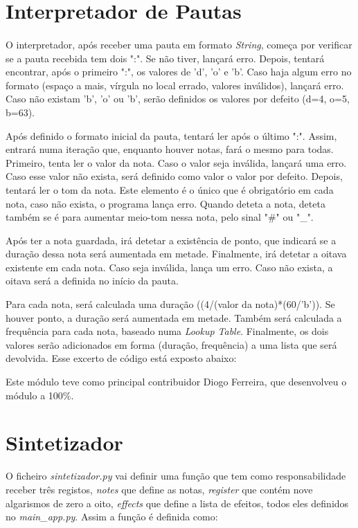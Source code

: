 \documentclass[11pt,openany,twoside]{report}
\begin{document}
\section{Interpretador de Pautas}
\paragraph{ } O interpretador, após receber uma pauta em formato \textit{String}, começa por verificar se a pauta recebida tem dois ":". Se não tiver, lançará erro. Depois, tentará encontrar, após o primeiro ":", os valores de 'd', 'o' e 'b'. Caso haja algum erro no formato (espaço a mais, vírgula no local errado, valores inválidos), lançará erro. Caso não existam 'b', 'o' ou 'b', serão definidos os valores por defeito (d=4, o=5, b=63).

Após definido o formato inicial da pauta, tentará ler após o último ":". Assim, entrará numa iteração que, enquanto houver notas, fará o mesmo para todas. Primeiro, tenta ler o valor da nota. Caso o valor seja inválida, lançará uma erro. Caso esse valor não exista, será definido como valor o valor por defeito. Depois, tentará ler o tom da nota. Este elemento é o único que é obrigatório em cada nota, caso não exista, o programa lança erro. Quando deteta a nota, deteta também se é para aumentar meio-tom nessa nota, pelo sinal "\#" ou "\_".

Após ter a nota guardada, irá detetar a existência de ponto, que indicará se a duração dessa nota será aumentada em metade. Finalmente, irá detetar a oitava existente em cada nota. Caso seja inválida, lança um erro. Caso não exista, a oitava será a definida no início da pauta.

Para cada nota, será calculada uma duração ((4/(valor da nota)*(60/'b')). Se houver ponto, a duração será aumentada em metade. Também será calculada a frequência para cada nota, baseado numa \textit{Lookup Table}. Finalmente, os dois valores serão adicionados em forma (duração, frequência) a uma lista que será devolvida. Esse excerto de código está exposto abaixo:


Este módulo teve como principal contribuidor Diogo Ferreira, que desenvolveu o módulo a 100\%.


\section{Sintetizador}
O ficheiro \textit{sintetizador.py} vai definir uma função que tem como responsabilidade receber três registos, \textit{notes} que define as notas, \textit{register} que contém nove algarismos de zero a oito, \textit{effects} que define a lista de efeitos, todos eles definidos no \textit{main\_app.py}. Assim a função é definida como:

\end{document}
